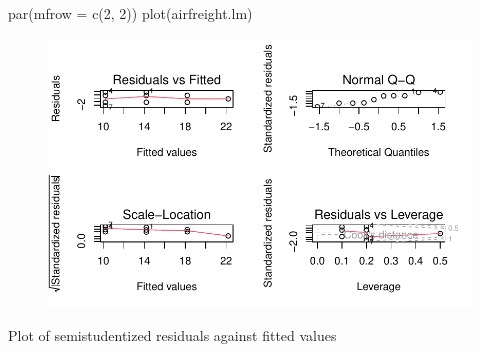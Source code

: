 \documentclass[
  letterpaper,
  DIV=11,
  numbers=noendperiod]{scrartcl}
\newenvironment{Shaded}{\begin{snugshade}}{\end{snugshade}}
\newcommand{\AttributeTok}[1]{\textcolor[rgb]{0.40,0.45,0.13}{#1}}
\newcommand{\DecValTok}[1]{\textcolor[rgb]{0.68,0.00,0.00}{#1}}
\newcommand{\FunctionTok}[1]{\textcolor[rgb]{0.28,0.35,0.67}{#1}}
\newcommand{\NormalTok}[1]{\textcolor[rgb]{0.00,0.23,0.31}{#1}}
\newcommand{\SpecialCharTok}[1]{\textcolor[rgb]{0.37,0.37,0.37}{#1}}
\newcommand{\StringTok}[1]{\textcolor[rgb]{0.13,0.47,0.30}{#1}}
\begin{document}
\begin{Shaded}
\begin{Highlighting}[]
\FunctionTok{par}\NormalTok{(}\AttributeTok{mfrow =} \FunctionTok{c}\NormalTok{(}\DecValTok{2}\NormalTok{, }\DecValTok{2}\NormalTok{))}
\FunctionTok{plot}\NormalTok{(airfreight.lm)}
\end{Highlighting}
\end{Shaded}

\begin{figure}[H]

{\centering \includegraphics{sta9700_ch3_hw_files/figure-pdf/unnamed-chunk-10-1.pdf}

}

\end{figure}

Plot of semistudentized residuals against fitted values

\begin{Shaded}
\end{Shaded}
\end{document}
